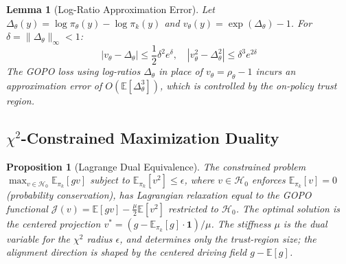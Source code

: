 \documentclass[11pt]{article}
\newtheorem{proposition}[theorem]{Proposition}
\newtheorem{lemma}[theorem]{Lemma}
\theoremstyle{definition}
\theoremstyle{remark}
\newcommand{\E}{\mathbb{E}}
\newcommand{\pik}{\pi_k}
\begin{document}
\begin{lemma}[Log-Ratio Approximation Error]
Let $\Delta_\theta(y) = \log\pi_\theta(y) - \log\pik(y)$ and $v_\theta(y) = \exp(\Delta_\theta) - 1$. For $\delta = \|\Delta_\theta\|_\infty < 1$:
\begin{equation}
    |v_\theta - \Delta_\theta| \leq \frac{1}{2}\delta^2 e^\delta, \quad |v_\theta^2 - \Delta_\theta^2| \leq \delta^3 e^{2\delta}
\end{equation}
The GOPO loss using log-ratios $\Delta_\theta$ in place of $v_\theta = \rho_\theta - 1$ incurs an approximation error of $O(\E[\Delta_\theta^3])$, which is controlled by the on-policy trust region.
\end{lemma}

\subsection{$\chi^2$-Constrained Maximization Duality}
\label{app:duality}

\begin{proposition}[Lagrange Dual Equivalence]
The constrained problem
$\max_{v \in \mathcal{H}_0} \E_{\pik}[g v]$ subject to $\E_{\pik}[v^2] \leq \epsilon$,
where $v \in \mathcal{H}_0$ enforces $\E_{\pik}[v] = 0$ (probability conservation),
has Lagrangian relaxation equal to the GOPO functional $\mathcal{J}(v) = \E[g v] - \frac{\mu}{2}\E[v^2]$ restricted to $\mathcal{H}_0$. The optimal solution is the centered projection $v^* = (g - \E_{\pik}[g]\cdot\mathbf{1})/\mu$. The stiffness $\mu$ is the dual variable for the $\chi^2$ radius $\epsilon$, and determines only the trust-region size; the alignment direction is shaped by the centered driving field $g - \E[g]$.
\end{proposition}
\end{document}
